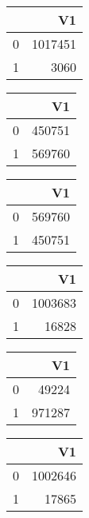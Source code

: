 \bigskip\bigskip
\centering
\begin{tabular}{rr}
  \hline
 & V1 \\ 
  \hline
0 & 1017451 \\ 
  1 & 3060 \\ 
   \hline
\end{tabular}

\bigskip\bigskip
\centering
\begin{tabular}{rr}
  \hline
 & V1 \\ 
  \hline
0 & 450751 \\ 
  1 & 569760 \\ 
   \hline
\end{tabular}

\bigskip\bigskip
\centering
\begin{tabular}{rr}
  \hline
 & V1 \\ 
  \hline
0 & 569760 \\ 
  1 & 450751 \\ 
   \hline
\end{tabular}

\bigskip\bigskip
\centering
\begin{tabular}{rr}
  \hline
 & V1 \\ 
  \hline
0 & 1003683 \\ 
  1 & 16828 \\ 
   \hline
\end{tabular}

\bigskip\bigskip
\centering
\begin{tabular}{rr}
  \hline
 & V1 \\ 
  \hline
0 & 49224 \\ 
  1 & 971287 \\ 
   \hline
\end{tabular}

\bigskip\bigskip
\centering
\begin{tabular}{rr}
  \hline
 & V1 \\ 
  \hline
0 & 1002646 \\ 
  1 & 17865 \\ 
   \hline
\end{tabular}

